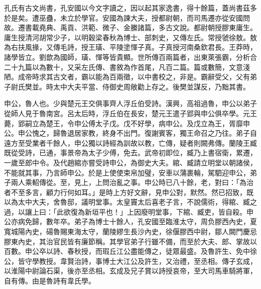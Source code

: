 \begin{pinyinscope}
孔氏有古文尚書，孔安國以今文字讀之，因以起其家逸書，得十餘篇，蓋尚書茲多於是矣。遭巫蠱，未立於學官。安國為諫大夫，授都尉朝，而司馬遷亦從安國問故。遷書載堯典、禹貢、洪範、微子、金縢諸篇，多古文說。都尉朝授膠東庸生。庸生授清河胡常少子，以明穀梁春秋為博士、部刺史，又傳左氏。常授虢徐敖。敖為右扶風掾，又傳毛詩，授王璜、平陵塗惲子真。子真授河南桑欽君長。王莽時，諸學皆立。劉歆為國師，璜、惲等皆貴顯。世所傳百兩篇者，出東萊張霸，分析合二十九篇以為數十，又采左氏傳、書敘為作首尾，凡百二篇。篇或數簡，文意淺陋。成帝時求其古文者，霸以能為百兩徵，以中書校之，非是。霸辭受父，父有弟子尉氏樊並。時太中大夫平當、侍御史周敞勸上存之。後樊並謀反，乃黜其書。

申公，魯人也。少與楚元王交俱事齊人浮丘伯受詩。漢興，高祖過魯，申公以弟子從師人見于魯南宮。呂太后時，浮丘伯在長安，楚元王遣子郢與申公俱卒學。元王薨，郢嗣立為楚王，令申公傅太子戊。戊不好學，病申公。及戊立為王，胥靡申公。申公愧之，歸魯退居家教，終身不出門。復謝賓客，獨王命召之乃往。弟子自遠方至受業者千餘人，申公獨以詩經為訓故以教，亡傳，疑者則闕弗傳。蘭陵王臧既從受詩，已通，事景帝為太子少傅，免去。武帝初即位，臧乃上書宿衛，累遷，一歲至郎中令。及代趙綰亦嘗受詩申公，為御史大夫。綰、臧請立明堂以朝諸侯，不能就其事，乃言師申公。於是上使使束帛加璧，安車以蒲裹輪，駕駟迎申公，弟子兩人乘軺傳從。至，見上，上問治亂之事。申公時已八十餘，老，對曰：「為治者不至多言，顧力行何如耳。」是時上方好文辭，見申公對，默然。然已招致，既以為太中大夫，舍魯邸，議明堂事。太皇竇太后喜老子言，不說儒術，得綰、臧之過，以讓上曰：「此欲復為新垣平也！」上因廢明堂事，下綰、臧吏，皆自殺。申公亦病免歸，數年卒。弟子為博士十餘人，孔安國至臨淮太守，周负膠西內史，夏寬城陽內史，碭魯賜東海太守，蘭陵繆生長沙內史，徐偃膠西中尉，鄒人闕門慶忌膠東內史，其治官民皆有廉節稱。其學官弟子行雖不備，而至於大夫、郎、掌故以百數。申公卒以詩、春秋授，而瑕丘江公盡能傳之，徒眾最盛。及魯許生、免中徐公，皆守學教授。韋賢治詩，事博士大江公及許生，又治禮，至丞相。傳子玄成，以淮陽中尉論石渠，後亦至丞相。玄成及兄子賞以詩授哀帝，至大司馬車騎將軍，自有傳。由是魯詩有韋氏學。


\end{pinyinscope}
